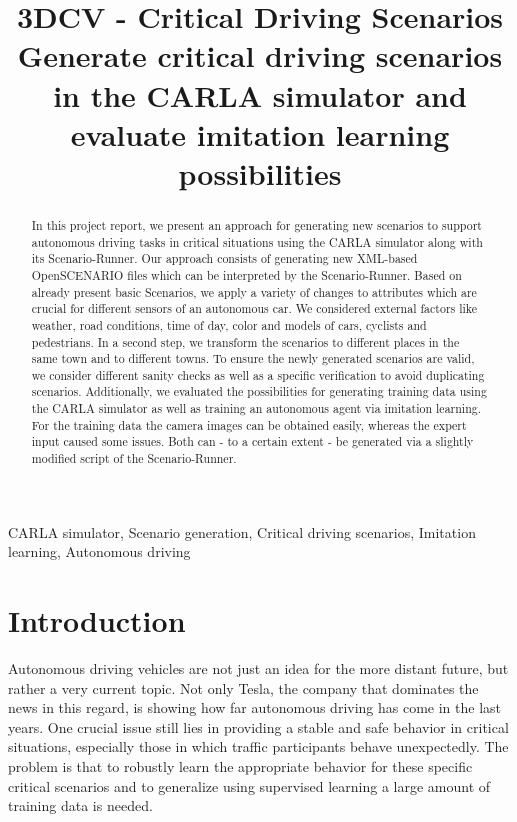 \documentclass[conference, a4paper, 11pt]{IEEEtran}
\begin{document}
	
	\title{3DCV - Critical Driving Scenarios\\
		{\small Generate critical driving scenarios in the CARLA simulator and evaluate imitation learning possibilities}
	}
	
	\author{
		\and
		\and
		\and
	}
	
	\maketitle
	
	\begin{abstract}
		In this project report, we present an approach for generating new scenarios to support autonomous driving tasks in critical situations using the CARLA simulator along with its Scenario-Runner. Our approach consists of generating new XML-based OpenSCENARIO files which can be interpreted by the Scenario-Runner. Based on already present basic Scenarios, we apply a variety  of changes to attributes which are crucial for different sensors of an autonomous car. We considered external factors like weather, road conditions, time of day, color and models of cars, cyclists and pedestrians. In a second step, we transform the scenarios to different places in the same town and to different towns. To ensure the newly generated scenarios are valid, we consider different sanity checks as well as a specific verification to avoid duplicating scenarios.
		Additionally, we evaluated the possibilities for generating training data using the CARLA simulator as well as training an autonomous agent via imitation learning. For the training data the camera images can be obtained easily, whereas the expert input caused some issues. Both can - to a certain extent - be generated via a slightly modified script of the Scenario-Runner.
		
	\end{abstract}
	
	\begin{IEEEkeywords}
		CARLA simulator, Scenario generation, Critical driving scenarios, Imitation learning, Autonomous driving
	\end{IEEEkeywords}
	
	\section{Introduction}
	Autonomous driving vehicles are not just an idea for the more distant future, but rather a very current topic.
	Not only Tesla, the company that dominates the news in this regard, is showing how far autonomous driving has come in the last years.
	One crucial issue still lies in providing a stable and safe behavior in critical situations, especially those in which traffic participants behave unexpectedly. 
	The problem is that to robustly learn the appropriate behavior for these specific critical scenarios and to generalize using supervised learning a large amount of training data is needed.
	
\end{document}
